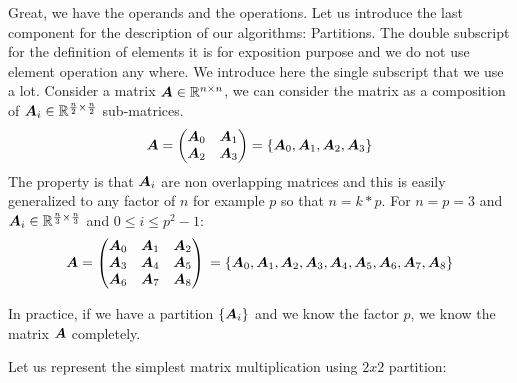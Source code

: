 \documentclass[acmsmall]{acmart}
\begin{document}
Great, we have the operands and the operations. Let us introduce the
last component for the description of our algorithms: Partitions.  The
double subscript for the definition of elements it is for exposition
purpose and we do not use element operation any where. We introduce
here the single subscript that we use a lot. Consider a matrix ${\boldsymbol A}
\in \mathbb{R}^{n\times n}$, we can consider the matrix as a composition of
${\boldsymbol A}_i \in \mathbb{R}^{\frac{n}{2}\times \frac{n}{2}}$ sub-matrices.
\begin{equation} 
  {\boldsymbol A} =
  \begin{pmatrix}
    {\boldsymbol A}_0 & {\boldsymbol A}_1 \\
    {\boldsymbol A}_2 & {\boldsymbol A}_3 \\
  \end{pmatrix} = \{ {\boldsymbol A}_0 , {\boldsymbol A}_1, {\boldsymbol A}_2 , {\boldsymbol A}_3  \}
\end{equation}
The property is that ${\boldsymbol A}_i$ are non overlapping matrices and this
is easily generalized to any factor of $n$ for example $p$ so that $n
= k*p$. For $n=p=3$ and ${\boldsymbol A}_i \in \mathbb{R}^{\frac{n}{3}\times
  \frac{n}{3}}$ and $0\leq i\leq p^2 -1$:
\begin{equation} 
  {\boldsymbol A} =
  \begin{pmatrix}
    {\boldsymbol A}_0 & {\boldsymbol A}_1 & {\boldsymbol A}_2 \\
    {\boldsymbol A}_3 & {\boldsymbol A}_4 & {\boldsymbol A}_{5} \\
    {\boldsymbol A}_6 & {\boldsymbol A}_7 & {\boldsymbol A}_8 \\
  \end{pmatrix}\\
  = \{ {\boldsymbol A}_0 , {\boldsymbol A}_1, {\boldsymbol A}_2 , {\boldsymbol A}_3 ,{\boldsymbol A}_4 , {\boldsymbol A}_5, {\boldsymbol A}_6 , {\boldsymbol A}_7, {\boldsymbol A}_8   \}
\end{equation}

In practice, if we have a partition $\{ {\boldsymbol A}_i \}$ and we know the
factor $p$, we know the matrix ${\boldsymbol A}$ completely.

Let us represent the simplest matrix multiplication using $2x2$ partition:
\end{document}

